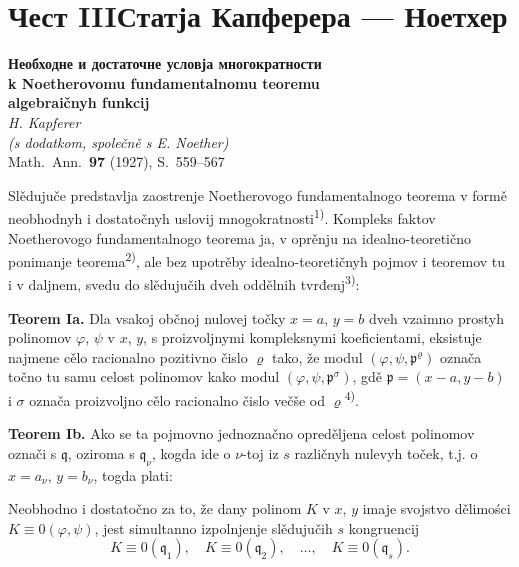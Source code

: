 \documentclass[11pt]{article}
\newcommand{\foreign}[1]{#1}
\theoremstyle{plain}
\begin{document}
\newpage
\part*{Чест III\hspace{1em}Статја Капферера --- Ноетхер}

\begin{center}
\Large\textbf{Необходне и достаточне условја многократности}\\[0.3em]
\Large\textbf{k Noetherovomu fundamentalnomu teoremu}\\[0.5em]
\large\textbf{algebraičnyh funkcij}\\[1em]
\normalsize\textit{H. Kapferer}\\[0.5em]
\small\textit{(s dodatkom, společně s E. Noether)}\\[1em]
\normalsize \foreign{Math.\ Ann.}\ \textbf{97} (1927), S.~559--567
\end{center}

\vspace{1em}

Slědujuče predstavlja zaostrenje Noetherovogo fundamentalnogo
teorema v formě neobhodnyh i dostatočnyh uslovij
mnogokratnosti\textsuperscript{1)}. Kompleks faktov Noetherovogo
fundamentalnogo teorema ja, v oprěnju na idealno-teoretično
ponimanje teorema\textsuperscript{2)}, ale bez upotrěby
idealno-teoretičnyh pojmov i teoremov tu i v daljnem, svedu do
slědujučih dveh oddělnih tvrđenj\textsuperscript{3)}:

\smallskip
\textbf{Teorem Ia.} Dla vsakoj občnoj nulovej točky $x = a$,
$y = b$ dveh vzaimno prostyh polinomov $\varphi$, $\psi$ v $x$, $y$,
s proizvoljnymi kompleksnymi koeficientami, eksistuje najmene cělo
racionalno pozitivno čislo $\varrho$ tako, že modul
$(\varphi, \psi, \mathfrak{p}^{\varrho})$ označa točno tu samu
celost polinomov kako modul $(\varphi, \psi, \mathfrak{p}^{\sigma})$,
gdě $\mathfrak{p} = (x-a, y-b)$ i $\sigma$ označa proizvoljno cělo
racionalno čislo večše od $\varrho$\textsuperscript{4)}.

\smallskip
\textbf{Teorem Ib.} Ako se ta pojmovno jednoznačno opreděljena
celost polinomov označi s $\mathfrak{q}$, oziroma s
$\mathfrak{q}_{\nu}$, kogda ide o $\nu$-toj iz $s$ različnyh nulevyh
toček, t.j. o $x = a_{\nu}$, $y = b_{\nu}$, togda plati:

Neobhodno i dostatočno za to, že dany polinom $K$ v $x$, $y$ imaje
svojstvo dělimości $K \equiv 0(\varphi, \psi)$, jest simultanno
izpolnjenje slědujučih $s$ kongruencij
\[
K \equiv 0(\mathfrak{q}_{1}), \quad K \equiv 0(\mathfrak{q}_{2}), \quad\ldots,\quad
K \equiv 0(\mathfrak{q}_{s}).
\]
\end{document}
